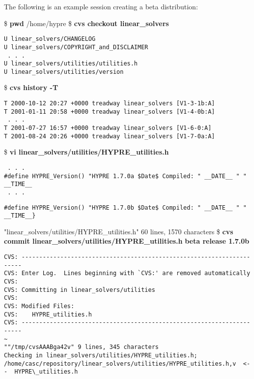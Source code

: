 The following is an example session creating a beta distribution:
\begin{ttfamily}
\begin{mdseries}
\linebreak
\$ \textbf{pwd}\linebreak
/home/hypre\linebreak
\$ \textbf{cvs checkout linear\_solvers}\linebreak
\begin{verbatim}
U linear_solvers/CHANGELOG
U linear_solvers/COPYRIGHT_and_DISCLAIMER
 . . .
U linear_solvers/utilities/utilities.h
U linear_solvers/utilities/version
\end{verbatim}
\$ \textbf{cvs history -T}\linebreak
\begin{verbatim}
T 2000-10-12 20:27 +0000 treadway linear_solvers [V1-3-1b:A]
T 2001-01-11 20:58 +0000 treadway linear_solvers [V1-4-0b:A]
 . . .
T 2001-07-27 16:57 +0000 treadway linear_solvers [V1-6-0:A]
T 2001-08-24 20:26 +0000 treadway linear_solvers [V1-7-0a:A]
\end{verbatim}
\$ \textbf{vi linear\_solvers/utilities/HYPRE\_utilities.h}\linebreak
\begin{verbatim}
 . . .
#define HYPRE_Version() "HYPRE 1.7.0a $Date$ Compiled: " __DATE__ " " __TIME__
 . . .
\end{verbatim}
\begin{bfseries}
\begin{verbatim}
#define HYPRE_Version() "HYPRE 1.7.0b $Date$ Compiled: " __DATE__ " " __TIME__}
\end{verbatim}
\end{bfseries}
"linear\_solvers/utilities/HYPRE\_utilities.h" 60 lines, 1570 characters\linebreak
\$ \textbf{cvs commit linear\_solvers/utilities/HYPRE\_utilities.h}\linebreak
\textbf{beta release 1.7.0b}\linebreak
\begin{verbatim}
CVS: ----------------------------------------------------------------------
CVS: Enter Log.	 Lines beginning with `CVS:' are removed automatically
CVS:
CVS: Committing in linear_solvers/utilities
CVS:
CVS: Modified Files:
CVS:	HYPRE_utilities.h
CVS: ----------------------------------------------------------------------
~
""/tmp/cvsAAABga42v" 9 lines, 345 characters
Checking in linear_solvers/utilities/HYPRE_utilities.h;
/home/casc/repository/linear_solvers/utilities/HYPRE_utilities.h,v  <--  HYPRE\_utilities.h

\end{verbatim}
\end{mdseries}
\end{ttfamily}
